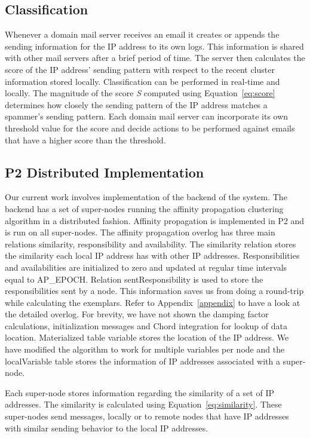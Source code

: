 \subsection{Classification}
\label{arch-classify}

Whenever a domain mail server receives an email it creates or appends the sending information for the IP address to its own logs. This information is shared with other mail servers after a brief period of time. The server then calculates the score of the IP address' sending pattern with respect to the recent cluster information stored locally. Classification can be performed in real-time and locally. The magnitude of the score \emph{S} computed using Equation~\ref{eq:score} determines how closely the sending pattern of the IP address matches a spammer's sending pattern. Each domain mail server can incorporate its own threshold value for the score and decide actions to be performed against emails that have a higher score than the threshold.

\subsection{P2 Distributed Implementation}
\label{sec:distP2}

Our current work involves implementation of the backend of the system. The backend has a set of super-nodes running the affinity propagation clustering algorithm in a distributed fashion. Affinity propagation is implemented in P2 and is run on all super-nodes. The affinity propagation overlog has three main relations similarity, responsibility and availability. The similarity relation stores the similarity each local IP address has with other IP addresses. Responsibilities and availabilities are initialized to zero and updated at regular time intervals equal to AP\_EPOCH. Relation sentResponsibility is used to store the responsibilities sent by a node. This information saves us from doing a round-trip while calculating the exemplars. Refer to Appendix~\ref{appendix} to have a look at the detailed overlog. For brevity, we have not shown the damping factor calculations, initialization messages and Chord integration for lookup of data location. Materialized table variable stores the location of the IP address. We have modified the algorithm to work for multiple variables per node and the localVariable table stores the information of IP addresses associated with a super-node.

Each super-node stores information regarding the similarity of a set of IP addresses. The similarity is calculated using Equation~\ref{eq:similarity}. 
These super-nodes send messages, locally or to remote nodes that have IP addresses with similar sending behavior to the local IP addresses.

